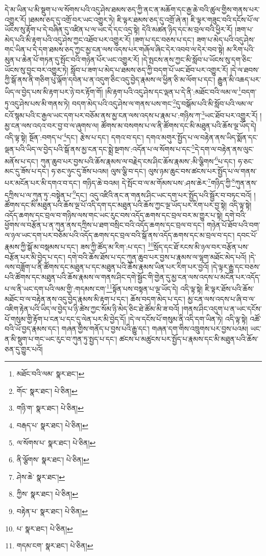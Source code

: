 དེ་མ་ཡིན་པ་མི་སྡུག་པ་ལ་སོགས་པའི་འདུ་ཤེས་ཐམས་ཅད་ཀྱི་ནང་ན་མཆོག་དང་རྒྱ་ཆེ་བའི་ཚུལ་གྱིས་གནས་པར་འགྱུར་རོ། །ཐམས་ཅད་དུ་འགྲོ་བར་ཡང་འགྱུར་ཏེ། ཇི་ལྟར་ཐམས་ཅད་དུ་འགྲོ་ཞེ་ན། ཇི་ལྟར་གཟུང་བའི་དངོས་པོ་ལ་ཡོངས་སུ་རྟོག་པ་དེ་བཞིན་དུ་འཛིན་པ་ལ་ཡང་དེ་དང་འདྲ་སྟེ། དེའི་མཚན་ཉིད་དང་མ་བྲལ་བའི་ཕྱིར་རོ། །ཟག་པ་མེད་པའི་མི་རྟག་པའི་འདུ་ཤེས་ཀྱང་འཐོབ་པར་འགྱུར་རོ། །ཟག་པ་དང་བཅས་པ་དང་། ཟག་པ་མེད་པའི་འདུ་ཤེས་གང་ཡིན་པ་དེ་དག་ཐམས་ཅད་ཀྱང་མྱ་ངན་ལས་འདས་པར་གཞོལ་ཞིང་དེར་འབབ་ལ་དེར་བབ་སྟེ། མ་རིག་པའི་མུན་པ་ཆེན་པོ་གཏན་དུ་སྤོང་བའི་གཉེན་པོར་ཡང་འགྱུར་རོ། །དེ་སྤངས་ནས་ཀྱང་མི་སློབ་པ་ཡོངས་སུ་དག་ཅིང་ཡོངས་སུ་བྱང་བར་འགྱུར་ཏེ། སློབ་པ་ཟག་པ་མེད་པ་ཐམས་ཅད་ཀྱི་བདག་པོ་ཡང་ཐོབ་པར་འགྱུར་རོ། །དེ་ལ་ཐབས་ཀྱི་སྒོ་ནས་ནི་གཅིག་པུ་ལྐོག་དབེན་པ་ན་འདུག་ཅིང་འདུ་བྱེད་རྣམས་ལ་ཕྱིན་ཅི་མ་ལོག་པ་དང་། རྒྱུན་མི་འཆད་པར་ཡིད་ལ་བྱེད་པས་མི་རྟག་པར་ཉེ་བར་རྟོག་གོ། །མི་རྟག་པའི་འདུ་ཤེས་དང་ལྡན་པ་དེ་ནི་:མཐོང་བའི་ལམ་ལ་\footnote{མཐོང་བའི་ལམ་  སྣར་ཐང་། }བདག་ཏུ་འདུ་ཤེས་པས་མི་གནས་ཏེ། བདག་མེད་པའི་འདུ་ཤེས་ལ་གནས་པས་གང་\footnote{གོང་  སྣར་ཐང་།  པེ་ཅིན། }དུ་བསྒོམ་པའི་མི་སློབ་པའི་ལམ་ལ་ངའོ་སྙམ་པའི་ང་རྒྱལ་ཡང་དག་པར་བཅོམ་ནས་མྱ་ངན་ལས་འདས་པ་རྣམ་པ་:གཉིས་ཀ་\footnote{གཉི་ག་  སྣར་ཐང་།  པེ་ཅིན། }ཡང་ཐོབ་པར་འགྱུར་རོ། །མྱ་ངན་ལས་འདའ་བར་བྱ་བ་ལ་ཞུགས་ལ། ཚོགས་མ་བསགས་པ་ལ་ནི་ཚོགས་དང་མི་མཐུན་པའི་ཆོས་ལྔ་ཡོད་དེ། འདི་ལྟ་སྟེ། སྔོན་:བགད་པ་\footnote{བརྒད་པ་  སྣར་ཐང་།  པེ་ཅིན། }དང་། རྩེས་པ་དང་། དགའ་བ་དང་། དགའ་མགུར་སྤྱོད་པ་ལ་བརྟེན་ནས་ཡིད་སྨོན་དང་ལྡན་པའི་ཡིད་ལ་བྱེད་པའི་སྒོ་ནས་མྱ་ངན་དང་སྨྲེ་སྔགས་:འདོན་པ་ལ་སོགས་པ་དང་\footnote{ལ་སོགས་པ་  སྣར་ཐང་།  པེ་ཅིན། }དེ་དག་ལ་བརྟེན་ནས་ལུང་མནོས་པ་དང་། ཀུན་ཆུབ་པར་བྱས་པའི་ཆོས་རྣམས་ལ་བརྗེད་ངས་ཤིང་ཆོས་རྣམས་:མི་ལྕིགས་\footnote{ནི་ལྕོགས་  སྣར་ཐང་།  པེ་ཅིན། }པ་དང་། ཧ་ཅང་མང་དུ་ཟོས་པ་དང་། ཧ་ཅང་ཉུང་དུ་ཟོས་པའམ། ལུས་ལྕི་བ་དང་། ལུས་ཉམ་ཆུང་བས་ཚངས་པར་སྤྱོད་པ་ལ་གནས་པར་མངོན་པར་མི་དགའ་བ་དང་། གཉིད་ཆེ་བའམ། དེ་སྤོང་བ་ལ་མ་གོམས་པས་:ཤས་ཆེར་\footnote{ཤེས་ཆེ་  སྣར་ཐང་། }གཉིད་ཀྱི་\footnote{ཀྱིས་  སྣར་ཐང་།  པེ་ཅིན། }ཀུན་ནས་དཀྲིས་པ་ལ་ཀུན་ཏུ་:བསྟེན་པ་\footnote{བརྟེན་པ་  སྣར་ཐང་།  པེ་ཅིན། }དང་། འདུ་འཛིའི་ནང་ན་གནས་ཤིང་ཡང་དག་པར་སྤྱོད་པའི་སྦྱོར་བ་བཏང་བའོ། །ཚོགས་དང་མི་མཐུན་པའི་ཆོས་ལྔ་པོ་འདི་དག་དང་མཐུན་པའི་ཆོས་ཀྱང་ལྔ་ཡོད་པར་རིག་པར་བྱ་སྟེ། འདི་ལྟ་སྟེ། འདོད་ཆགས་དང་བྲལ་བ་གཉིས་ལས་གང་ཡང་རུང་བས་འདོད་ཆགས་དང་བྲལ་བར་མ་གྱུར་པ་སྟེ། དགེ་བའི་ཕྱོགས་ལ་བརྩོན་པ་ན་ཀུན་ནས་དཀྲིས་པ་ཐག་བསྲིང་བའི་འདོད་ཆགས་དང་བྲལ་བ་དང་། གཉེན་པོ་ཐོབ་པའི་བག་ལ་ཉལ་ཡང་དག་པར་བཅོམ་པའི་འདོད་ཆགས་དང་བྲལ་བའི་སྒོ་ནས་འདོད་ཆགས་དང་མ་བྲལ་བ་དང་། དབང་པོ་རྣམས་ཀྱི་སྒོ་མ་བསྡམས་པ་དང་། ཟས་ཀྱི་ཚོད་མ་རིག་:པ་དང་། \footnote{པ་  སྣར་ཐང་།  པེ་ཅིན། }སྲོད་དང་ཐོ་རངས་མི་ཉལ་བར་བརྩོན་པས་བརྩོན་པར་མི་བྱེད་པ་དང་། དགེ་བའི་ཆོས་ཐོས་པ་དང་ཀུན་ཆུབ་པར་བྱས་པ་རྣམས་ལ་ལྷག་མཐོང་མེད་པའོ། །དེ་ལས་བཟློག་པ་ནི་ཚོགས་དང་མཐུན་པ་དང་མཐུན་པའི་ཆོས་རྣམས་ཡིན་པར་རིག་པར་བྱའོ། །དེ་ལྟར་རྒྱུ་དང་བཅས་པའི་ཚོགས་དང་མཐུན་པའི་ཆོས་རྣམས་ལ་གནས་ཤིང་དགེ་སྦྱོང་གི་གྱེན་དུ་མྱ་ངན་ལས་འདས་པ་མངོན་པར་འདོད་པ་ལ་ནི་ཡང་དག་པའི་ལམ་གྱི་:གདམས་ངག་\footnote{གདམ་ངག་  སྣར་ཐང་།  པེ་ཅིན། }སྟོན་པས་བསྟན་པ་ལྔ་ཡོད་དེ། འདི་ལྟ་སྟེ། ཇི་ལྟར་ཐོས་པའི་ཆོས་མཐོང་བ་ལ་བརྟེན་ནས་འདུ་བྱེད་རྣམས་མི་རྟག་པ་དང་། ཆོས་བདག་མེད་པ་དང་། མྱ་ངན་ལས་འདས་པ་ཞི་བ་ལ་འཇིག་རྟེན་པའི་ཡིད་ལ་བྱེད་པ་ཉི་ཚེས་ཀྱང་སོམ་ཉི་མེད་ཅིང་ཐེ་ཚོམ་མི་ཟ་བའོ། །གནས་ཤིང་འདུག་པ་ན་ཡང་དངོས་པོ་གསུམ་གྱི་རྟོག་པ་ངན་པ་དང་དུ་ལེན་པར་མི་བྱེད་དོ། །དེ་ལ་དངོས་པོ་གསུམ་ནི་འདི་དག་ཡིན་ཏེ། འདི་ལྟ་སྟེ། འཚོ་བའི་ཡོ་བྱད་རྣམས་དང་། གཞན་གྱིས་གནོད་པ་བྱས་པའི་རྒྱུ་དང་། གཞན་དག་གིས་འཁྲུགས་པར་བྱས་པའམ། ཡང་ན་མི་སྡུག་པ་གང་ཡང་རུང་བ་ཀུན་ཏུ་སྤྱད་པ་དང་། ཚངས་པ་མཚུངས་པར་སྤྱོད་པ་རྣམས་དང་མི་མཐུན་པའི་ཆོས་ཅན་དུ་གྱུར་པའོ། 